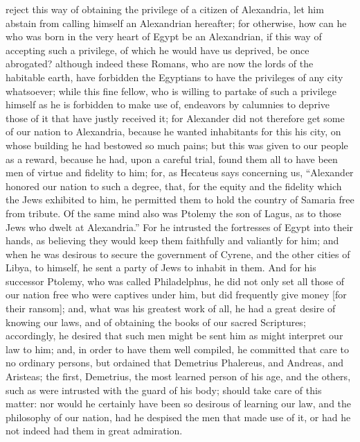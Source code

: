 reject this way of obtaining the privilege of a citizen of Alexandria, let
him abstain from calling himself an Alexandrian hereafter; for otherwise,
how can he who was born in the very heart of Egypt be an Alexandrian, if
this way of accepting such a privilege, of which he would have us
deprived, be once abrogated? although indeed these Romans, who are now the
lords of the habitable earth, have forbidden the Egyptians to have the
privileges of any city whatsoever; while this fine fellow, who is willing
to partake of such a privilege himself as he is forbidden to make use of,
endeavors by calumnies to deprive those of it that have justly received
it; for Alexander did not therefore get some of our nation to Alexandria,
because he wanted inhabitants for this his city, on whose building he had
bestowed so much pains; but this was given to our people as a reward,
because he had, upon a careful trial, found them all to have been men of
virtue and fidelity to him; for, as Hecateus says concerning us,
``Alexander honored our nation to such a degree, that, for the equity and
the fidelity which the Jews exhibited to him, he permitted them to hold
the country of Samaria free from tribute. Of the same mind also was
Ptolemy the son of Lagus, as to those Jews who dwelt at Alexandria.'' For
he intrusted the fortresses of Egypt into their hands, as believing they
would keep them faithfully and valiantly for him; and when he was desirous
to secure the government of Cyrene, and the other cities of Libya, to
himself, he sent a party of Jews to inhabit in them. And for his successor
Ptolemy, who was called Philadelphus, he did not only set all those of our
nation free who were captives under him, but did frequently give money
[for their ransom]; and, what was his greatest work of all, he had a great
desire of knowing our laws, and of obtaining the books of our sacred
Scriptures; accordingly, he desired that such men might be sent him as
might interpret our law to him; and, in order to have them well compiled,
he committed that care to no ordinary persons, but ordained that Demetrius
Phalereus, and Andreas, and Aristeas; the first, Demetrius, the most
learned person of his age, and the others, such as were intrusted with the
guard of his body; should take care of this matter: nor would he certainly
have been so desirous of learning our law, and the philosophy of our
nation, had he despised the men that made use of it, or had he not indeed
had them in great admiration.

